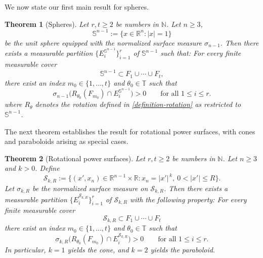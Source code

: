\documentclass[11pt]{article}
\numberwithin{equation}{section}
\newtheorem{theorem}{Theorem}[section]
\theoremstyle{remark}
\begin{document}
We now state our first main result for spheres.


\begin{theorem}[Spheres]\label{thm:sphere-Raimi}
Let $r, t\ge 2$ be numbers in $\mathbb{N}$.
Let $n\ge 3$,
\[
\mathbb{S}^{n-1} := \{x\in\mathbb{R}^n : |x|=1\}
\]
be the unit sphere equipped with the normalized surface measure $\sigma_{n-1}$.
Then there exists a measurable partition $\{E_i^{\mathbb{S}^{n-1}}\}_{i=1}^r$ of $\mathbb{S}^{n-1}$ such that:
For every finite measurable cover
\[
\mathbb{S}^{n-1} \subset F_1\cup\cdots\cup F_t,
\]
there exist an index $m_0\in\{1,\dots,t\}$ and $\theta_0\in \mathbb{T}$ such that
\[
\sigma_{n-1}\big(R_{\theta_0}(F_{m_0})
    \cap E_i^{\mathbb{S}^{n-1}}\big)>0
\qquad\text{for all }1\le i\le r.
\]
where $R_\theta$ denotes the rotation defined in \eqref{definition-rotation} as restricted to $\mathbb{S}^{n-1}$.
\end{theorem}



The next theorem establishes the result for rotational power surfaces, with cones and paraboloids arising as special cases.
\begin{theorem}[Rotational power surfaces]\label{thm:power-surface-Raimi}
Let $r, t\ge 2$ be numbers in $\mathbb{N}$. 
Let $n\ge 3$ and $k>0$. Define
\[
\mathcal{S}_{k,R}
 := \big\{(x',x_n)\in\mathbb{R}^{n-1}\times\mathbb{R}
        : x_n = |x'|^{\,k},\ 0<|x'|\le R\big\}.
\]
Let
$\sigma_{k,R}$ be the normalized surface measure on $\mathcal{S}_{k,R}$.
Then there exists a measurable partition
$\{E_i^{\mathcal{S}_{k,R}}\}_{i=1}^r$ of $\mathcal{S}_{k,R}$ with the following property:
For every finite measurable cover
\[
\mathcal{S}_{k,R} \subset F_1\cup\cdots\cup F_t
\]
there exist an index $m_0\in\{1,\dots,t\}$ and $\theta_0\in \mathbb{T}$ such that
\[
\sigma_{k,R}\big(R_{\theta_0}(F_{m_0})
       \cap E_i^{\mathcal{S}_{k,R}}\big)>0
\qquad\text{for all }1\le i\le r.
\]
In particular, $k=1$ yields the cone, and $k=2$ yields the paraboloid.
\end{theorem}

\end{document}
